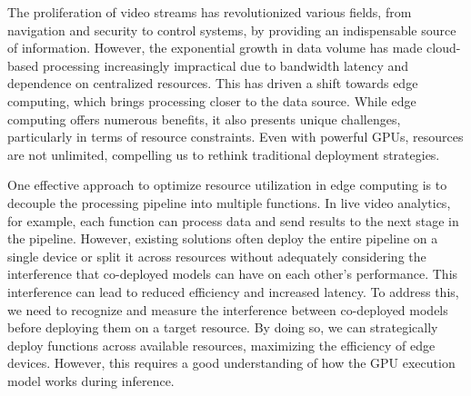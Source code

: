 

The proliferation of video streams has revolutionized various fields, from navigation and security to control systems, by providing an indispensable source of information. However, the exponential growth in data volume has made cloud-based processing increasingly impractical due to bandwidth latency and dependence on centralized resources. This has driven a shift towards edge computing, which brings processing closer to the data source. While edge computing offers numerous benefits, it also presents unique challenges, particularly in terms of resource constraints. Even with powerful GPUs, resources are not unlimited, compelling us to rethink traditional deployment strategies.

One effective approach to optimize resource utilization in edge computing is to decouple the processing pipeline into multiple functions. In live video analytics, for example, each function can process data and send results to the next stage in the pipeline. However, existing solutions often deploy the entire pipeline on a single device or split it across resources without adequately considering the interference that co-deployed models can have on each other's performance. This interference can lead to reduced efficiency and increased latency. To address this, we need to recognize and measure the interference between co-deployed models before deploying them on a target resource. By doing so, we can strategically deploy functions across available resources, maximizing the efficiency of edge devices. However, this requires a good understanding of how the GPU execution model works during inference.

